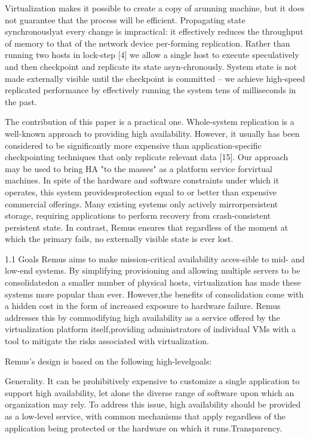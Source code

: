 Virtualization makes it possible to create a copy of arunning machine, but it
does not guarantee that the process will be efficient. 
Propagating state synchronouslyat every change is impractical: it effectively
reduces the throughput of memory to that of the network device per-forming
replication. 
Rather than running two hosts in lock-step [4] we allow a single host to
execute speculatively and then checkpoint and replicate its state
asyn-chronously. 
System state is not made externally visible until the checkpoint is committed --
we achieve high-speed replicated performance by effectively running the system
tens of milliseconds in the past.

The contribution of this paper is a practical one.
Whole-system replication is a well-known approach to providing high
availability.
However, it usually has been considered to be significantly more expensive than
application-specific checkpointing techniques that only replicate relevant data
[15]. 
Our approach may be used to bring HA "to the masses" as a platform service
forvirtual machines. 
In spite of the hardware and software constraints under which it operates, this
system providesprotection equal to or better than expensive commercial
offerings. 
Many existing systems only actively mirrorpersistent storage, requiring
applications to perform recovery from crash-consistent persistent state. 
In contrast, Remus ensures that regardless of the moment at which the primary
fails, no externally visible state is ever lost.

1.1 Goals
Remus aims to make mission-critical availability acces-sible to mid- and
low-end systems. 
By simplifying provisioning and allowing multiple servers to be consolidatedon
a smaller number of physical hosts, virtualization has made these systems more
popular than ever. 
However,the benefits of consolidation come with a hidden cost in the form of
increased exposure to hardware failure.
Remus addresses this by commodifying high availability as a service offered by
the virtualization platform itself,providing administrators of individual VMs
with a tool to mitigate the risks associated with virtualization.

Remus's design is based on the following high-levelgoals:

Generality. It can be prohibitively expensive to customize a single application
to support high availability, let alone the diverse range of software upon
which an organization may rely. 
To address this issue, high availability should be provided as a low-level
service, with common mechanisms that apply regardless of the application being
protected or the hardware on which it runs.Transparency.

